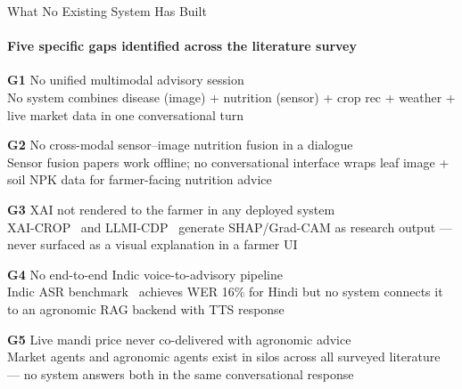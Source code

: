 \documentclass[aspectratio=169, 10pt]{beamer}
\begin{document}
\begin{frame}{What No Existing System Has Built}
  \framesubtitle{Five specific gaps identified across the literature survey}

  \begin{tcolorbox}[gapbox=Coral, before skip=0pt, after skip=2.5pt]
    \footnotesize\textbf{\color{Coral}G1 \;} No unified multimodal advisory session\\
    {\scriptsize\color{Muted} No system combines disease (image) + nutrition (sensor) + crop rec + weather + live market data in one conversational turn}
  \end{tcolorbox}
  \begin{tcolorbox}[gapbox=Amber, before skip=0pt, after skip=2.5pt]
    \footnotesize\textbf{\color{Amber}G2 \;} No cross-modal sensor--image nutrition fusion in a dialogue\\
    {\scriptsize\color{Muted} Sensor fusion papers work offline; no conversational interface wraps leaf image + soil NPK data for farmer-facing nutrition advice}
  \end{tcolorbox}
  \begin{tcolorbox}[gapbox=Green, before skip=0pt, after skip=2.5pt]
    \footnotesize\textbf{\color{Green}G3 \;} XAI not rendered to the farmer in any deployed system\\
    {\scriptsize\color{Muted} XAI-CROP~\cite{xaicrop2024} and LLMI-CDP~\cite{llmicdp2025} generate SHAP/Grad-CAM as research output — never surfaced as a visual explanation in a farmer UI}
  \end{tcolorbox}
  \begin{tcolorbox}[gapbox=Blue, before skip=0pt, after skip=2.5pt]
    \footnotesize\textbf{\color{Blue}G4 \;} No end-to-end Indic voice-to-advisory pipeline\\
    {\scriptsize\color{Muted} Indic ASR benchmark~\cite{indicasr2025} achieves WER 16\% for Hindi but no system connects it to an agronomic RAG backend with TTS response}
  \end{tcolorbox}
  \begin{tcolorbox}[gapbox=Purple, before skip=0pt, after skip=0pt]
    \footnotesize\textbf{\color{Purple}G5 \;} Live mandi price never co-delivered with agronomic advice\\
    {\scriptsize\color{Muted} Market agents and agronomic agents exist in silos across all surveyed literature — no system answers both in the same conversational response}
  \end{tcolorbox}
\end{frame}
\end{document}
